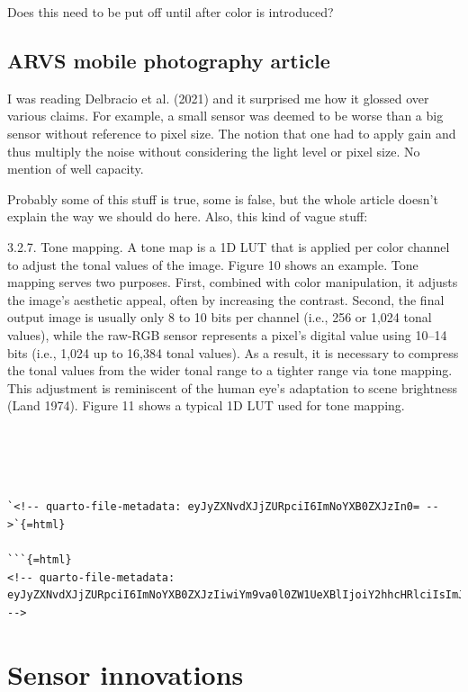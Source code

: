 \documentclass[
  letterpaper,
]{book}
\begin{document}
Does this need to be put off until after color is introduced?

\section{ARVS mobile photography
article}\label{arvs-mobile-photography-article}

I was reading Delbracio et al. (2021) and it surprised me how it glossed
over various claims. For example, a small sensor was deemed to be worse
than a big sensor without reference to pixel size. The notion that one
had to apply gain and thus multiply the noise without considering the
light level or pixel size. No mention of well capacity.

Probably some of this stuff is true, some is false, but the whole
article doesn't explain the way we should do here. Also, this kind of
vague stuff:

3.2.7. Tone mapping. A tone map is a 1D LUT that is applied per color
channel to adjust the tonal values of the image. Figure 10 shows an
example. Tone mapping serves two purposes. First, combined with color
manipulation, it adjusts the image's aesthetic appeal, often by
increasing the contrast. Second, the final output image is usually only
8 to 10 bits per channel (i.e., 256 or 1,024 tonal values), while the
raw-RGB sensor represents a pixel's digital value using 10--14 bits
(i.e., 1,024 up to 16,384 tonal values). As a result, it is necessary to
compress the tonal values from the wider tonal range to a tighter range
via tone mapping. This adjustment is reminiscent of the human eye's
adaptation to scene brightness (Land 1974). Figure 11 shows a typical 1D
LUT used for tone mapping.

\begin{verbatim}




`<!-- quarto-file-metadata: eyJyZXNvdXJjZURpciI6ImNoYXB0ZXJzIn0= -->`{=html}

```{=html}
<!-- quarto-file-metadata: eyJyZXNvdXJjZURpciI6ImNoYXB0ZXJzIiwiYm9va0l0ZW1UeXBlIjoiY2hhcHRlciIsImJvb2tJdGVtTnVtYmVyIjoyMCwiYm9va0l0ZW1GaWxlIjoiY2hhcHRlcnMvc2Vuc29ycy0wNy1pbm5vdmF0aW9ucy5xbWQiLCJib29rSXRlbURlcHRoIjoxfQ== -->
\end{verbatim}

\chapter{Sensor innovations}\label{sec-sensor-innovations}
\end{document}
